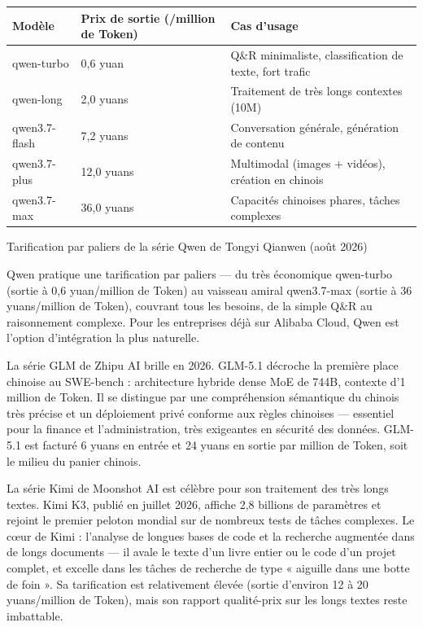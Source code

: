 \begin{center}
\begin{tabularx}{\linewidth}{|X|X|X|}
\hline
\textbf{Modèle} & \textbf{Prix de sortie (/million de Token)} & \textbf{Cas d'usage} \tabularnewline
\hline
qwen-turbo & 0,6 yuan & Q\&R minimaliste, classification de texte, fort trafic \tabularnewline
qwen-long & 2,0 yuans & Traitement de très longs contextes (10M) \tabularnewline
qwen3.7-flash & 7,2 yuans & Conversation générale, génération de contenu \tabularnewline
qwen3.7-plus & 12,0 yuans & Multimodal (images + vidéos), création en chinois \tabularnewline
qwen3.7-max & 36,0 yuans & Capacités chinoises phares, tâches complexes \tabularnewline
\hline
\end{tabularx}
\end{center}

\begin{center}\small\color{gray}Tarification par paliers de la série Qwen de Tongyi Qianwen (août 2026)\end{center}

Qwen pratique une tarification par paliers — du très économique qwen-turbo (sortie à 0,6 yuan/million de Token) au vaisseau amiral qwen3.7-max (sortie à 36 yuans/million de Token), couvrant tous les besoins, de la simple Q\&R au raisonnement complexe. Pour les entreprises déjà sur Alibaba Cloud, Qwen est l'option d'intégration la plus naturelle.


La série GLM de Zhipu AI brille en 2026. GLM-5.1 décroche la première place chinoise au SWE-bench : architecture hybride dense MoE de 744B, contexte d'1 million de Token. Il se distingue par une compréhension sémantique du chinois très précise et un déploiement privé conforme aux règles chinoises — essentiel pour la finance et l'administration, très exigeantes en sécurité des données. GLM-5.1 est facturé 6 yuans en entrée et 24 yuans en sortie par million de Token, soit le milieu du panier chinois.


La série Kimi de Moonshot AI est célèbre pour son traitement des très longs textes. Kimi K3, publié en juillet 2026, affiche 2,8 billions de paramètres et rejoint le premier peloton mondial sur de nombreux tests de tâches complexes. Le cœur de Kimi : l'analyse de longues bases de code et la recherche augmentée dans de longs documents — il avale le texte d'un livre entier ou le code d'un projet complet, et excelle dans les tâches de recherche de type « aiguille dans une botte de foin ». Sa tarification est relativement élevée (sortie d'environ 12 à 20 yuans/million de Token), mais son rapport qualité-prix sur les longs textes reste imbattable.

